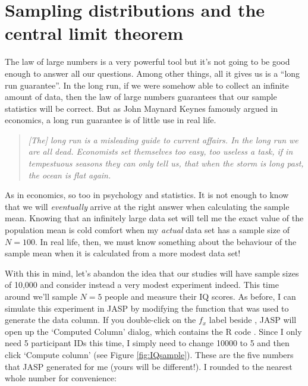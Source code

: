 \section{Sampling distributions and the central limit theorem~\label{sec:samplesandclt}}

The law of large numbers is a very powerful tool but it's not going to be good enough to answer all our questions. Among other things, all it gives us is a ``long run guarantee''. In the long run, if we were somehow able to collect an infinite amount of data, then the law of large numbers guarantees that our sample statistics will be correct. But as John Maynard Keynes famously argued in economics, a long run guarantee is of little use in real life.
\begin{quote}
{\it [The] long run is a misleading guide to current affairs. In the long run we are all dead. Economists set themselves too easy, too useless a task, if in tempestuous seasons they can only tell us, that when the storm is long past, the ocean is flat again.} \parencite[p.~80]{Keynes1923}
\end{quote}
As in economics, so too in psychology and statistics. It is not enough to know that we will {\it eventually} arrive at the right answer when calculating the sample mean. Knowing that an infinitely large data set will tell me the exact value of the population mean is cold comfort when my {\it actual} data set has a sample size of $N=100$. In real life, then, we must know something about the behaviour of the sample mean when it is calculated from a more modest data set!


With this in mind, let's abandon the idea that our studies will have sample sizes of 10,000 and consider instead a very modest experiment indeed. This time around we'll sample $N=5$ people and measure their IQ scores. As before, I can simulate this experiment in JASP by modifying the  function that was used to generate the  data column.  If you double-click on the $f_x$ label beside , JASP will open up the `Computed Column' dialog, which contains the R code .  Since I only need 5 participant IDs this time, I simply need to change 10000 to 5 and then click `Compute column' (see Figure \ref{fig:IQsample}).  These are the five numbers that JASP generated for me (yours will be different!). I rounded to the nearest whole number for convenience:

